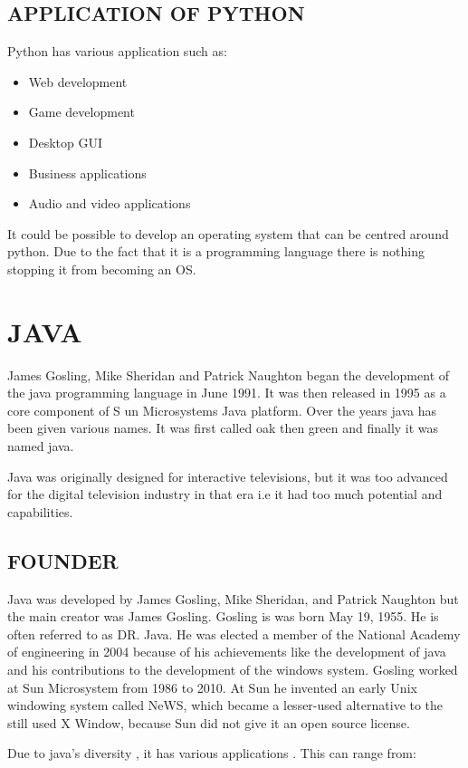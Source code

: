 \documentclass{article}
\begin{document}
\subsection{APPLICATION OF PYTHON}
	Python has various application such as:
\begin{itemize}
	\item Web development
	\item Game development
	\item Desktop GUI
	\item Business applications
	\item Audio and video applications
\end{itemize}

It could be possible to develop an operating system that can be centred around python. Due to the fact that it is a programming language there is nothing stopping it from becoming an OS.         


\section{JAVA}

	James Gosling, Mike Sheridan and Patrick Naughton began the development of the java programming language in June 1991. It was then released in 1995 as a core component of S un Microsystems Java platform. Over the years java has been given various names. It was first called oak then green and finally it was named java.

Java was originally designed for interactive televisions, but it was too advanced for the digital television industry in that era i.e it had too much potential and capabilities.

\subsection{FOUNDER}
	Java was developed by James Gosling, Mike Sheridan, and Patrick Naughton but the main creator was James Gosling.
Gosling is was born May 19, 1955. He is often referred to as DR. Java. He was elected a member of the National Academy of engineering in 2004 because of his achievements like the development of java and his contributions to the development of the windows system.
Gosling worked at Sun Microsystem from 1986 to 2010. At Sun he invented an early Unix windowing system called NeWS, which became a lesser-used alternative to the still used X Window, because Sun did not give it an open source license.

	Due to java’s diversity , it has various applications . This can range from:
\end{document}
